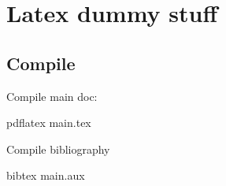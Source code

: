 
\chapter{Latex dummy stuff} %

\label{Chapter1} %



\section{Compile}

Compile main doc:

pdflatex main.tex

Compile bibliography

bibtex main.aux




